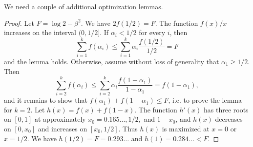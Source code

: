 \documentclass{article}
\newtheorem{lem}[thm]{Lemma}
\newcommand{\s}[1]{\left(#1\right)}
\begin{document}
We need a couple of additional optimization lemmas.


\begin{proof} Let $F = \log 2 - \beta^2$. We have $2f(1/2)=F$.
	The function $f(x)/x$ increases on the interval $(0,1/2]$. If $\alpha_i < 1/2$ for every $i$, then $$\sum_{i=1}^{k} f(\alpha_i) \leq \sum_{i=1}^k \alpha_i \frac{f(1/2)}{1/2} = F$$ and the lemma holds.
	Otherwise, assume without loss of generality  that  $\alpha_1 \geq 1/2$. Then $$\sum_{i=2}^{k} f(\alpha_i) \leq \sum_{i=2}^k \alpha_i \frac{f(1-\alpha_1)}{1-\alpha_1} = f(1-\alpha_1),$$
	and it remains to show that $f(\alpha_1)+f(1-\alpha_1) \leq F$, i.e. to prove the lemma for $k=2$. Let $h(x)=f(x)+f(1-x).$ The function $h'(x)$  has three roots on $[0,1]$ at approximately $x_0=0.165..., 1/2,$ and $1-x_0$, and $h(x)$ decreases on $[0,x_0]$ and increases on $[x_0,1/2]$. Thus $h(x)$ is maximized at $x=0$ or $x=1/2$. We have  $h(1/2)=F=0.293\ldots$ and $h(1)=0.284\ldots < F$.      
\end{proof}

\end{document}
